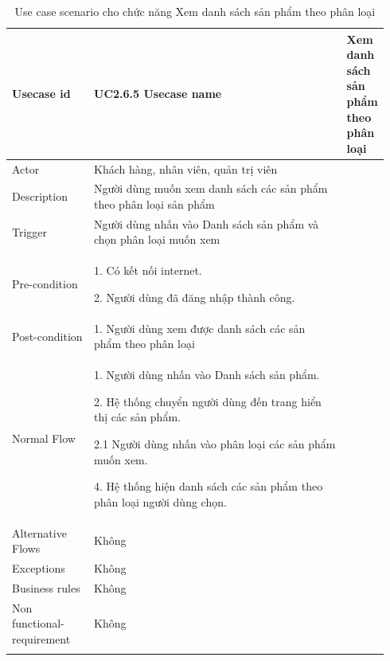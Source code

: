 \begin{longtable}{|>{\hspace{0pt}}m{0.229\linewidth}|>{\hspace{0pt}}m{0.713\linewidth}|} 
\hline
Usecase id & UC2.6.5 \endfirsthead 
\hline
Usecase name & Xem danh sách sản phẩm theo phân loại \\ 
\hline
Actor & Khách hàng, nhân viên, quản trị viên \\ 
\hline
Description & Người dùng muốn xem danh sách các sản phẩm theo phân loại sản phẩm\\ 
\hline
Trigger & Người dùng nhấn vào Danh sách sản phẩm và chọn phân loại muốn xem  \\ 
\hline
Pre-condition & 1. Có kết nối internet.\par{}2. Người dùng đã đăng nhập thành công. \\ 
\hline
Post-condition & 1. Người dùng xem được danh sách các sản phẩm theo phân loại\\
\hline
Normal Flow & 1. Người dùng nhấn vào Danh sách sản phẩm.\par{}2. Hệ thống chuyển người dùng đến trang hiển thị các sản phẩm.\par{}2.1 Người dùng nhấn vào phân loại các sản phẩm muốn xem.\par{} 4. Hệ thống hiện danh sách các sản phẩm theo phân loại người dùng chọn. \\
\hline
Alternative Flows & Không~ \\ 
\hline
Exceptions & Không \\ 
\hline
Business rules & Không \\ 
\hline
Non functional-requirement & Không \\ 
\hline
\caption{Use case scenario cho chức năng Xem danh sách sản phẩm theo phân loại}
\end{longtable}


